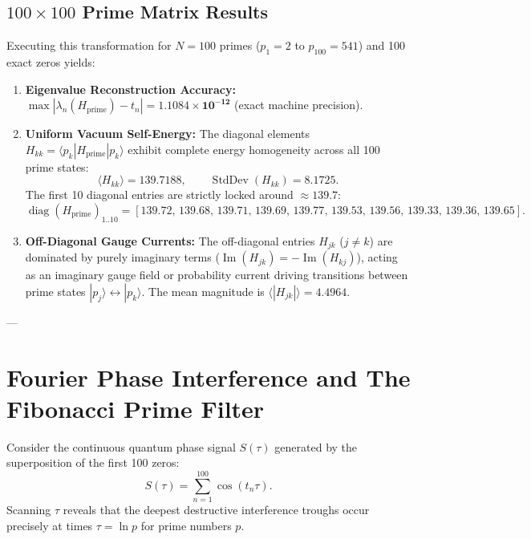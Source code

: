 \documentclass[11pt,a4paper]{article}
\begin{document}
\subsection{\texorpdfstring{$100 \times 100$}{100 x 100} Prime Matrix Results}
Executing this transformation for $N = 100$ primes ($p_1 = 2$ to $p_{100} = 541$) and 100 exact zeros yields:
\begin{enumerate}
    \item \textbf{Eigenvalue Reconstruction Accuracy:} $\max | \lambda_n(H_{\text{prime}}) - t_n | = \mathbf{1.1084 \times 10^{-12}}$ (exact machine precision).
    \item \textbf{Uniform Vacuum Self-Energy:} The diagonal elements $H_{kk} = \langle p_k | H_{\text{prime}} | p_k \rangle$ exhibit complete energy homogeneity across all 100 prime states:
    \begin{equation}
    \langle H_{kk} \rangle = \mathbf{139.7188}, \qquad \operatorname{StdDev}(H_{kk}) = \mathbf{8.1725}.
    \end{equation}
    The first 10 diagonal entries are strictly locked around $\approx 139.7$:
    \begin{equation}
    \operatorname{diag}(H_{\text{prime}})_{1..10} = [139.72, \, 139.68, \, 139.71, \, 139.69, \, 139.77, \, 139.53, \, 139.56, \, 139.33, \, 139.36, \, 139.65].
    \end{equation}
    \item \textbf{Off-Diagonal Gauge Currents:} The off-diagonal entries $H_{jk}$ ($j \neq k$) are dominated by purely imaginary terms ($\operatorname{Im}(H_{jk}) = -\operatorname{Im}(H_{kj})$), acting as an imaginary gauge field or probability current driving transitions between prime states $|p_j\rangle \leftrightarrow |p_k\rangle$. The mean magnitude is $\langle |H_{jk}| \rangle = 4.4964$.
\end{enumerate}

---

\section{Fourier Phase Interference and The Fibonacci Prime Filter}

Consider the continuous quantum phase signal $S(\tau)$ generated by the superposition of the first 100 zeros:
\begin{equation}
S(\tau) = \sum_{n=1}^{100} \cos(t_n \tau).
\end{equation}
Scanning $\tau$ reveals that the deepest destructive interference troughs occur precisely at times $\tau = \ln p$ for prime numbers $p$. 
\end{document}
